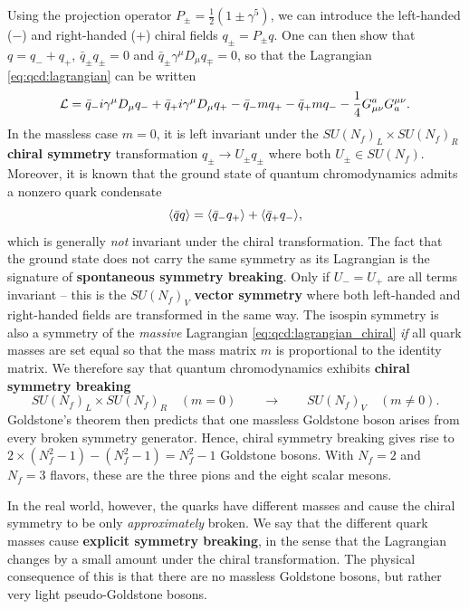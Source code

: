 Using the projection operator $P_\pm = \frac12 (1 \pm \gamma^5)$, we can introduce the left-handed ($-$) and right-handed ($+$) chiral fields $q_\pm = P_\pm q$.
One can then show that $q = q_- + q_+$, $\bar{q}_\pm q_\pm = 0$ and $\bar{q}_\pm \gamma^\mu D_\mu q_\mp = 0$, so that the Lagrangian \eqref{eq:qcd:lagrangian} can be written
\begin{equation}
	\mathcal{L} = \bar{q}_- i \gamma^\mu D_\mu q_- + \bar{q}_+ i \gamma^\mu D_\mu q_+ - \bar{q}_- m q_+ - \bar{q}_+ m q_- - \frac14 G_{\mu\nu}^a G^{\mu\nu}_a.
\label{eq:qcd:lagrangian_chiral}
\end{equation}
In the massless case $m=0$,
it is left invariant under the $SU(N_f)_L \times SU(N_f)_R$ \textbf{chiral symmetry} transformation $q_\pm \rightarrow U_\pm q_\pm$ where both $U_\pm \in SU(N_f)$.
Moreover, it is known that the ground state of quantum chromodynamics admits a nonzero quark condensate \cite[chapter 28]{ref:schwartz}
\begin{equation}
	\avg{\bar{q} q} %
	                                                            = \avg{\bar{q}_- q_+} + \avg{\bar{q}_+ q_-},
\end{equation}
which is generally \emph{not} invariant under the chiral transformation.
The fact that the ground state does not carry the same symmetry as its Lagrangian is the signature of \textbf{spontaneous symmetry breaking}.
Only if $U_- = U_+$ are all terms invariant -- this is the $SU(N_f)_V$ \textbf{vector symmetry} where both left-handed and right-handed fields are transformed in the same way.
The isospin symmetry is also a symmetry of the \emph{massive} Lagrangian \eqref{eq:qcd:lagrangian_chiral} \emph{if} all quark masses are set equal so that the mass matrix $m$ is proportional to the identity matrix.
We therefore say that quantum chromodynamics exhibits \textbf{chiral symmetry breaking}
\begin{equation}
	SU(N_f)_L \times SU(N_f)_R \quad (m = 0) \qquad \longrightarrow \qquad SU(N_f)_V \quad (m \neq 0).
\label{eq:qcd:symmetry_breaking_pattern}
\end{equation}
Goldstone's theorem then predicts that one massless Goldstone boson arises from every broken symmetry generator.
Hence, chiral symmetry breaking gives rise to $2 \times (N_f^2 - 1) - (N_f^2 - 1) = N_f^2 - 1$ Goldstone bosons.
With $N_f = 2$ and $N_f = 3$ flavors, these are the three pions and the eight scalar mesons.

In the real world, however, the quarks have different masses and cause the chiral symmetry to be only \emph{approximately} broken.
We say that the different quark masses cause \textbf{explicit symmetry breaking}, in the sense that the Lagrangian changes by a small amount under the chiral transformation.
The physical consequence of this is that there are no massless Goldstone bosons, but rather very light pseudo-Goldstone bosons.

